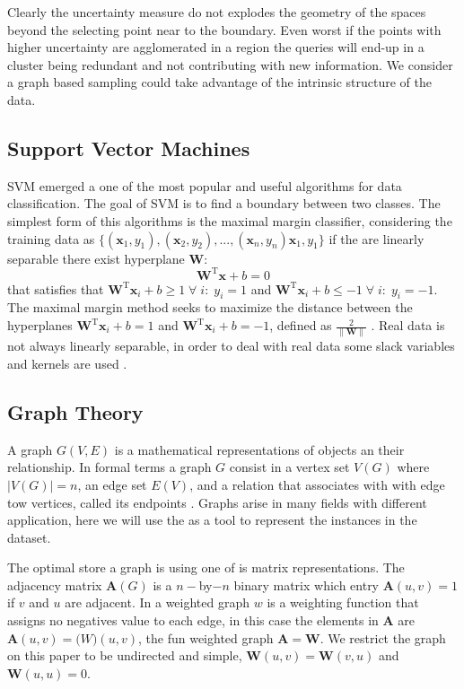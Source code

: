 \documentclass[12 pt]{IEEEtran}
\begin{document}
Clearly the uncertainty measure do not explodes  the geometry of the spaces beyond the selecting point near to the boundary. Even worst if the points with higher uncertainty are 
agglomerated in a region the queries will end-up in a cluster being redundant and not  contributing with new information. We consider a graph based sampling could take advantage of the intrinsic structure of the data. 

\subsection{Support Vector Machines}

SVM emerged a one of the most popular  and useful algorithms for data classification. The  goal of SVM is to  find a boundary between two classes.  The simplest form of this algorithms is the maximal margin classifier, considering the training data as $\{(\mathbf{x}_1,y_1),(\mathbf{x}_2,y_2),...,(\mathbf{x}_n,y_n)\mathbf{x}_1,y_1\}$ if the are linearly separable there exist hyperplane $\mathbf{W}$:
\begin{equation}
    \mathbf{W}^{\mathrm{T}}\mathbf{x}+b=0
\end{equation}
that satisfies that $\mathbf{W}^{\mathrm{T}}\mathbf{x}_i+b\geq 1 \; \forall \;i: \; y_{i}=1$  and $\mathbf{W}^{\mathrm{T}}\mathbf{x}_i+b\leq -1 \; \forall \;i: \; y_{i}=-1$. The maximal margin method seeks to maximize the distance between  the hyperplanes $\mathbf{W}^{\mathrm{T}}\mathbf{x}_i+b =1 $  and $\mathbf{W}^{\mathrm{T}}\mathbf{x}_i+b=-1$, defined as $\frac{2}{\parallel \mathbf{W} \parallel}$ \cite{steinwart2008support}. Real data is not always linearly separable, in order to deal with real data some slack variables and kernels are used \cite{hearst1998support}.


\subsection{Graph Theory}

A graph $G(V,E)$ is a mathematical representations of objects an their relationship. In formal terms a graph $G$  consist in a vertex set $V(G)$ where $|V(G)|=n$,  an edge set $E(V)$, and a relation that  associates  with with edge tow vertices, called its endpoints \cite{west1996introduction}. Graphs  arise in many fields with different application, here we will use the as a tool to represent the instances in the dataset. 

The optimal store a graph is using one of is matrix representations. The adjacency matrix $\mathbf{A}(G)$ is a $n-$by$-n$ binary matrix  which entry $\mathbf{A}(u,v)=1$ if $v$ and $u$ are adjacent. In a weighted graph $w$ is a weighting function  that assigns  no negatives value  to each edge, in this case the elements in $\mathbf{A}$ are $\mathbf{A}(u,v)=\mathbf(W)(u,v)$, the fun weighted graph $\mathbf{A}=\mathbf{W}$.  We restrict the graph on this paper to be undirected and simple, $\mathbf{W}(u,v)=\mathbf{W}(v,u)$ and $\mathbf{W}(u,u)=0$.
\end{document}
